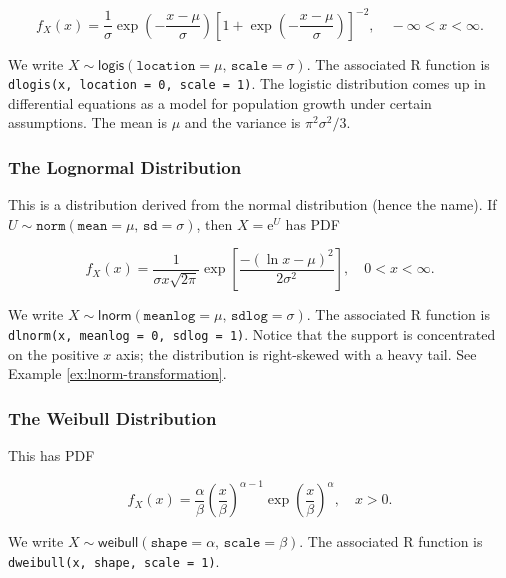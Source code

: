 \documentclass[]{book}
\numberwithin{equation}{chapter}
\numberwithin{figure}{chapter}
\theoremstyle{plain}
\theoremstyle{definition}
\theoremstyle{remark}
\theoremstyle{definition}
\theoremstyle{definition}
\theoremstyle{remark}
\begin{document}
\begin{equation}
f_{X}(x)=\frac{1}{\sigma}\exp\left(-\frac{x-\mu}{\sigma}\right)\left[1+\exp\left(-\frac{x-\mu}{\sigma}\right)\right]^{-2},\quad -\infty < x < \infty.
\end{equation}

We write
\(X\sim\mathsf{logis}(\mathtt{location}=\mu,\,\mathtt{scale}=\sigma)\).
The associated R function is
\texttt{dlogis(x,\ location\ =\ 0,\ scale\ =\ 1)}. The logistic
distribution comes up in differential equations as a model for
population growth under certain assumptions. The mean is \(\mu\) and the
variance is \(\pi^{2}\sigma^{2}/3\).

\subsubsection{The Lognormal
Distribution}\label{sub-the-lognormal-distribution}

This is a distribution derived from the normal distribution (hence the
name). If
\(U\sim\mathtt{norm}(\mathtt{mean}=\mu,\,\mathtt{sd}=\sigma)\), then
\(X = \mathrm{e}^{U}\) has PDF

\begin{equation}
f_{X}(x)=\frac{1}{\sigma x\sqrt{2\pi}}\exp\left[\frac{-(\ln x-\mu)^{2}}{2\sigma^{2}}\right], \quad 0 < x < \infty.
\end{equation}

We write
\(X\sim\mathsf{lnorm}(\mathtt{meanlog}=\mu,\,\mathtt{sdlog}=\sigma)\).
The associated R function is
\texttt{dlnorm(x,\ meanlog\ =\ 0,\ sdlog\ =\ 1)}. Notice that the
support is concentrated on the positive \(x\) axis; the distribution is
right-skewed with a heavy tail. See Example
\ref{ex:lnorm-transformation}.

\subsubsection{The Weibull
Distribution}\label{sub-the-weibull-distribution}

This has PDF

\begin{equation}
f_{X}(x)=\frac{\alpha}{\beta}\left(\frac{x}{\beta}\right)^{\alpha-1}\exp\left(\frac{x}{\beta}\right)^{\alpha},\quad x>0.
\end{equation}

We write
\(X\sim\mathsf{weibull}(\mathtt{shape}=\alpha,\,\mathtt{scale}=\beta)\).
The associated R function is \texttt{dweibull(x,\ shape,\ scale\ =\ 1)}.
\end{document}
